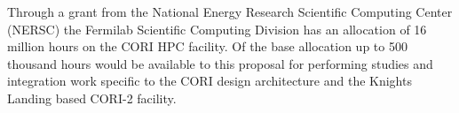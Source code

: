 Through a grant from the National Energy Research Scientific Computing Center (NERSC) the Fermilab Scientific Computing Division has an allocation of 16 million hours on the CORI HPC facility.  Of the base allocation up to 500 thousand hours would be available to this proposal for performing studies and integration work specific to the CORI design architecture and the Knights Landing based CORI-2 facility.

